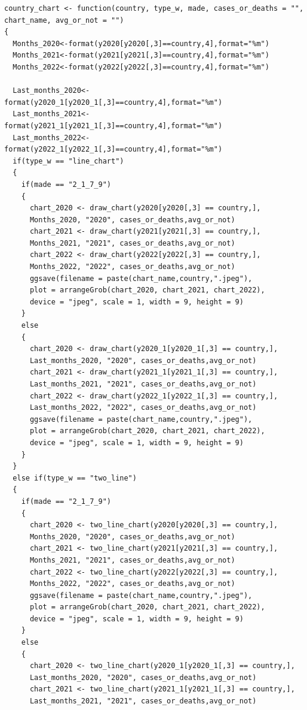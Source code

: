 \documentclass[a4paper]{article}
\theoremstyle{definition}
\begin{document}
\begin{enumerate}[i)]
\begin{lstlisting}[frame = single]
country_chart <- function(country, type_w, made, cases_or_deaths = "", 
chart_name, avg_or_not = "")
{
  Months_2020<-format(y2020[y2020[,3]==country,4],format="%m")
  Months_2021<-format(y2021[y2021[,3]==country,4],format="%m")
  Months_2022<-format(y2022[y2022[,3]==country,4],format="%m")
  
  Last_months_2020<-format(y2020_1[y2020_1[,3]==country,4],format="%m")
  Last_months_2021<-format(y2021_1[y2021_1[,3]==country,4],format="%m")
  Last_months_2022<-format(y2022_1[y2022_1[,3]==country,4],format="%m")
  if(type_w == "line_chart")
  {
    if(made == "2_1_7_9")
    {
      chart_2020 <- draw_chart(y2020[y2020[,3] == country,], 
      Months_2020, "2020", cases_or_deaths,avg_or_not)
      chart_2021 <- draw_chart(y2021[y2021[,3] == country,], 
      Months_2021, "2021", cases_or_deaths,avg_or_not)
      chart_2022 <- draw_chart(y2022[y2022[,3] == country,], 
      Months_2022, "2022", cases_or_deaths,avg_or_not)
      ggsave(filename = paste(chart_name,country,".jpeg"), 
      plot = arrangeGrob(chart_2020, chart_2021, chart_2022), 
      device = "jpeg", scale = 1, width = 9, height = 9)
    }
    else
    {
      chart_2020 <- draw_chart(y2020_1[y2020_1[,3] == country,],
      Last_months_2020, "2020", cases_or_deaths,avg_or_not)
      chart_2021 <- draw_chart(y2021_1[y2021_1[,3] == country,],
      Last_months_2021, "2021", cases_or_deaths,avg_or_not)
      chart_2022 <- draw_chart(y2022_1[y2022_1[,3] == country,],
      Last_months_2022, "2022", cases_or_deaths,avg_or_not)
      ggsave(filename = paste(chart_name,country,".jpeg"), 
      plot = arrangeGrob(chart_2020, chart_2021, chart_2022), 
      device = "jpeg", scale = 1, width = 9, height = 9)
    }
  }
  else if(type_w == "two_line")
  {
    if(made == "2_1_7_9")
    {
      chart_2020 <- two_line_chart(y2020[y2020[,3] == country,], 
      Months_2020, "2020", cases_or_deaths,avg_or_not)
      chart_2021 <- two_line_chart(y2021[y2021[,3] == country,], 
      Months_2021, "2021", cases_or_deaths,avg_or_not)
      chart_2022 <- two_line_chart(y2022[y2022[,3] == country,], 
      Months_2022, "2022", cases_or_deaths,avg_or_not)
      ggsave(filename = paste(chart_name,country,".jpeg"), 
      plot = arrangeGrob(chart_2020, chart_2021, chart_2022), 
      device = "jpeg", scale = 1, width = 9, height = 9)
    }
    else
    {
      chart_2020 <- two_line_chart(y2020_1[y2020_1[,3] == country,],
      Last_months_2020, "2020", cases_or_deaths,avg_or_not)
      chart_2021 <- two_line_chart(y2021_1[y2021_1[,3] == country,],
      Last_months_2021, "2021", cases_or_deaths,avg_or_not)

\end{lstlisting}
\end{enumerate}
\end{document}
